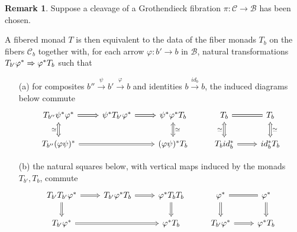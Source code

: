 \documentclass[a4paper,10pt
,draft
]{article}%
\numberwithin{equation}{section}
\numberwithin{figure}{section}
\theoremstyle{definition} %
\newtheorem{remark}[equation]{Remark}%
\newcommand{\1}{\ensuremath{\mathbbm 1}}%
\begin{document}
\begin{remark}\label{FIBMONCL REM}
Suppose a cleavage of a Grothendieck fibration
$\pi \colon \mathcal{C} \to \mathcal{B}$ 
has been chosen.

A fibered monad $T$ is then equivalent to the data of the fiber monads 
$T_b$ on the fibers $\mathcal{C}_b$ together with,
for each arrow $\varphi \colon b' \to b$ in $\mathcal{B}$,
natural transformations
$T_{b'} \varphi^{\**} \Rightarrow \varphi^{\**} T_{b}$
such that
\begin{itemize}
\item[(a)]
for composites $b'' \xrightarrow{\psi} b' \xrightarrow{\varphi} b$
and identities $b \xrightarrow{id_b} b$,
the induced diagrams below commute
\begin{equation}\label{GROTHASS EQ}
\begin{tikzcd}
	T_{b''} \psi^{\**} \varphi^{\**} 
	\ar[Rightarrow]{r} \ar[Leftrightarrow]{d}[swap]{\simeq} &
	\psi^{\**} T_{b'} \varphi^{\**} \ar[Rightarrow]{r} &
	\psi^{\**} \varphi^{\**}  T_{b} \ar[Leftrightarrow]{d}{\simeq} &
	T_b \ar[equal]{r} \ar[Leftrightarrow]{d}[swap]{\simeq} &
	T_b \ar[Leftrightarrow]{d}{\simeq}
\\
	T_{b''} (\varphi \psi)^{\**} \ar[Rightarrow]{rr}{} &&
	(\varphi \psi)^{\**} T_{b} &
	T_b id_b^{\**} \ar[Rightarrow]{r}{} &
	id_b^{\**} T_{b}
\end{tikzcd}
\end{equation}
\item[(b)] the natural squares below,
with vertical maps induced by the monads $T_{b'},T_b$, commute 
\begin{equation}\label{GROTHCART EQ}
\begin{tikzcd}
	T_{b'} T_{b'} \varphi^{\**} \ar[Rightarrow]{r} \ar[Rightarrow]{d}[swap]{} &
	T_{b'} \varphi^{\**} T_{b} \ar[Rightarrow]{r} &
	\varphi^{\**} T_{b} T_{b} \ar[Rightarrow]{d}{} &
	\varphi^{\**} \ar[equal]{r} \ar[Rightarrow]{d}&
	\varphi^{\**} \ar[Rightarrow]{d}
\\
	T_{b'} \varphi^{\**} \ar[Rightarrow]{rr}{} &&
	\varphi^{\**} T_{b} &
	T_{b'} \varphi^{\**} \ar[Rightarrow]{r}{} &
	\varphi^{\**} T_{b}
\end{tikzcd}
\end{equation}
\end{itemize}
\end{remark}
\end{document}
